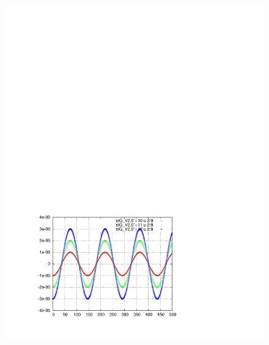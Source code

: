 \documentclass[]{article}
\begin{document}
\begin{figure}[h]
\begin{minipage}[b]{0.45\linewidth}
\includegraphics[scale=0.55]{pdf/delta_vs_turn_V2p0.pdf}
\end{minipage}
%
%
\begin{minipage}[b]{0.45\linewidth}
\centering

\end{minipage}
\end{figure}
\end{document}
